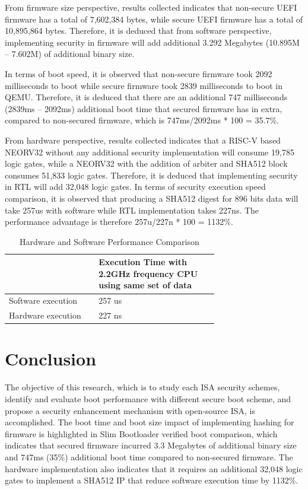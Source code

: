 \documentclass[a4paper,fleqn]{cas-dc}
\begin{document}
From firmware size perspective, results collected indicates that non-secure UEFI firmware has a total of 7,602,384 bytes, while secure UEFI firmware has a total of 10,895,864 bytes. Therefore, it is deduced that from software perspective, implementing security in firmware will add additional 3.292 Megabytes (10.895M – 7.602M) of additional binary size.

In terms of boot speed, it is observed that non-secure firmware took 2092 milliseconds to boot while secure firmware took 2839 milliseconds to boot in QEMU. Therefore, it is deduced that there are an additional 747 milliseconds (2839ms – 2092ms) additional boot time that secured firmware has in extra, compared to non-secured firmware, which is 747ms/2092ms * 100 = 35.7\%.

From hardware perspective, results collected indicates that a RISC-V based NEORV32 without any additional security implementation will consume 19,785 logic gates, while a NEORV32 with the addition of arbiter and SHA512 block consumes 51,833 logic gates. Therefore, it is deduced that implementing security in RTL will add 32,048 logic gates. In terms of security execution speed comparison, it is observed that producing a SHA512 digest for 896 bits data will take 257us with software while RTL implementation takes 227ns. The performance advantage is therefore 257u/227n * 100 = 1132\%.

\begin{table}[hbt!]
\caption{Hardware and Software Performance Comparison}
    \begin{tabular}{|p{0.3\linewidth} | p{0.4\linewidth} |}
        \hline
         & Execution Time with 2.2GHz frequency CPU using same set of data \\
        \hline 
        Software execution & 257 us  \\
        \hline
        Hardware execution & 227 ns \\
        \hline
    \end{tabular}
\end{table}

\section{ Conclusion}
The objective of this research, which is to study each ISA security schemes, identify and evaluate boot performance with different secure boot scheme, and propose a security enhancement mechanism with open-source ISA, is accomplished. The boot time and boot size impact of implementing hashing for firmware is highlighted in Slim Bootloader verified boot comparison, which indicates that secured firmware incurred 3.3 Megabytes of additional binary size and 747ms (35\%) additional boot time compared to non-secured firmware. The hardware implementation also indicates that it requires an additional 32,048 logic gates to implement a SHA512 IP that reduce software execution time by 1132\%.
\end{document}
